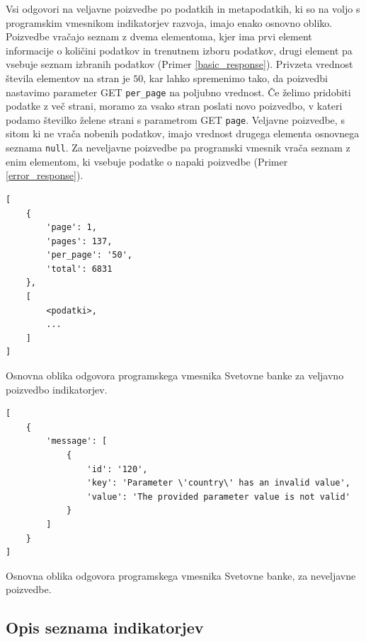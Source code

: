 Vsi odgovori na veljavne poizvedbe po podatkih in metapodatkih, ki so na voljo
s programskim vmesnikom indikatorjev razvoja, imajo enako osnovno obliko. 
Poizvedbe vračajo seznam z dvema elementoma, kjer ima prvi element 
informacije o količini podatkov in trenutnem izboru podatkov, drugi element 
pa vsebuje seznam izbranih podatkov (Primer \ref{basic_response}). Privzeta
vrednost števila elementov na stran je $50$, kar lahko spremenimo tako, da
poizvedbi nastavimo parameter GET \verb|per_page| na poljubno vrednost. Če
želimo pridobiti podatke z več strani, moramo za vsako stran poslati novo
poizvedbo, v kateri podamo številko želene strani s parametrom GET \verb|page|.
Veljavne poizvedbe, s sitom ki ne vrača nobenih podatkov, imajo vrednost 
drugega elementa osnovnega seznama \verb|null|.
Za neveljavne poizvedbe pa programski vmesnik vrača seznam z enim elementom,
ki vsebuje podatke o napaki poizvedbe (Primer \ref{error_response}).


\begin{snippet}
\begin{center}
\begin{lstlisting}
[
    {
        'page': 1,
        'pages': 137,
        'per_page': '50',
        'total': 6831
    },
    [
        <podatki>,
        ...
    ]
]
\end{lstlisting}
\end{center}
\caption{Osnovna oblika odgovora programskega vmesnika Svetovne banke za
veljavno poizvedbo indikatorjev.} 
\label{basic_response}
\end{snippet} 


\begin{snippet}
\begin{center}
\begin{lstlisting}
[
    {
        'message': [
            {
                'id': '120',
                'key': 'Parameter \'country\' has an invalid value',
                'value': 'The provided parameter value is not valid'
            }
        ]
    }
]
\end{lstlisting}
\end{center}
\caption{Osnovna oblika odgovora programskega vmesnika Svetovne banke, za
neveljavne poizvedbe.}
\label{error_response}
\end{snippet} 


\subsection{Opis seznama indikatorjev}

